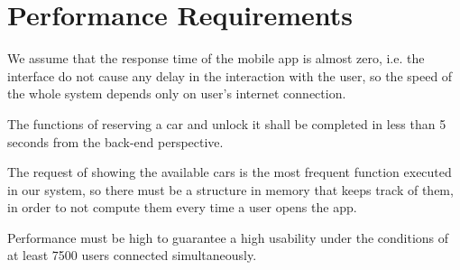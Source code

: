 \section{Performance Requirements}

We assume that the response time of the mobile app is almost zero, i.e. the interface do not cause any delay in the interaction with the user, so the speed of the whole system depends only on user's internet connection.

The functions of reserving a car and unlock it shall be completed in less than 5 seconds from the back-end perspective.

The request of showing the available cars is the most frequent function executed in our system, so there must be a structure in memory that keeps track of them, in order to not compute them every time a user opens the app.

Performance must be high to guarantee a high usability under the conditions of at least 7500 users connected simultaneously.
